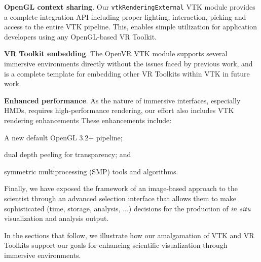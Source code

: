 \textbf{OpenGL context sharing}.
Our \texttt{vtkRenderingExternal} VTK module provides a complete integration API
including proper lighting, interaction, picking and access to the entire
VTK pipeline.
This, enables simple utilization for application developers using
any OpenGL-based VR Toolkit.

\textbf{VR Toolkit embedding}.
The OpenVR VTK module supports several immersive environments directly
without the issues faced by previous work, and is a complete template
for embedding other VR Toolkits within VTK in future work.

\textbf{Enhanced performance}.
As the nature of immersive interfaces, especially HMDs, requires
high-performance rendering, our effort also includes VTK rendering enhancements
These enhancements include:

\begin{compactitem}
\item A new default OpenGL 3.2+ pipeline;
\item dual depth peeling for transparency; and 
\item symmetric multiprocessing (SMP) tools and algorithms.
\end{compactitem}

Finally, we have exposed the framework of an image-based approach to the scientist through an advanced selection interface that allows them to make sophisticated (time, storage, analysis, ...) decisions for the production of \textit{in situ} visualization and analysis output.

In the sections that follow, we illustrate how our amalgamation of VTK and VR Toolkits support our goals for enhancing scientific visualization through immersive environments.

